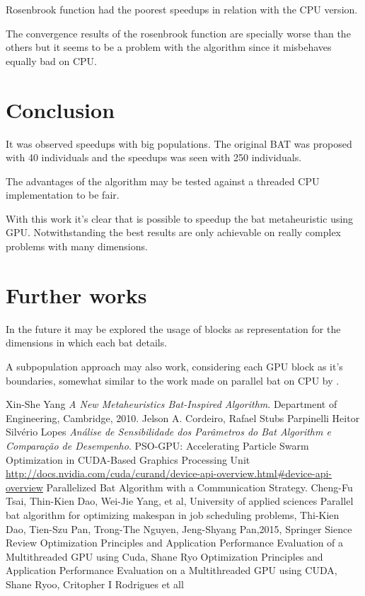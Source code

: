 \documentclass[conference]{IEEEtran}
\begin{document}
Rosenbrook function had the poorest speedups in relation with the CPU
version.

The convergence results of the rosenbrook function are specially worse
than the others but it seems to be a problem with the algorithm since it
misbehaves equally bad on CPU.

\section{Conclusion}

It was observed speedups with big populations. The original BAT was
proposed with 40 individuals and the speedups was seen with 250
individuals.

The advantages of the algorithm may be tested against a threaded CPU
implementation to be fair.

With this work it's clear that is possible to speedup the bat
metaheuristic using GPU. Notwithstanding the best results are only
achievable on really complex problems with many dimensions.

\section{Further works}

In the future it may be explored the usage of blocks as representation
for the dimensions in which each bat details.

A subpopulation approach may also work, considering each GPU block as
it's boundaries, somewhat similar to the work made on parallel bat on
CPU by \cite{paralellCPU}.

\begin{thebibliography}{1}
    Xin-She Yang \emph{A New Metaheuristics Bat-Inspired Algorithm}. Department of Engineering, Cambridge, 2010.
    Jelson A. Cordeiro, Rafael Stubs Parpinelli Heitor Silvério Lopes \emph{Análise de Sensibilidade dos Parâmetros do Bat Algorithm e Comparação de Desempenho}.
    PSO-GPU: Accelerating Particle Swarm Optimization in CUDA-Based Graphics Processing Unit
    \url{http://docs.nvidia.com/cuda/curand/device-api-overview.html#device-api-overview}
    Parallelized Bat Algorithm with a Communication Strategy. Cheng-Fu Tsai, Thin-Kien Dao, Wei-Jie Yang, et al, University of applied sciences
    Parallel bat algorithm for optimizing makespan in job scheduling problems, Thi-Kien Dao, Tien-Szu Pan, Trong-The Nguyen, Jeng-Shyang Pan,2015, Springer Sience Review
    Optimization Principles and Application Performance Evaluation of a Multithreaded GPU using Cuda, Shane Ryo
    Optimization Principles and Application Performance Evaluation on a Multithreaded GPU using CUDA, Shane Ryoo, Critopher I Rodrigues et all

\end{thebibliography}
\end{document}
